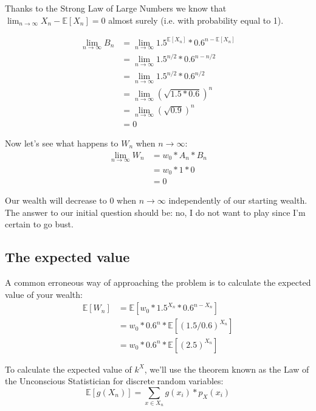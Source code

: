 \documentclass[12pt]{article}
\begin{document}
Thanks to the Strong Law of Large Numbers we know that $\lim_{n\to\infty}{X_n - \mathbb{E}[X_n]} = 0$ almost surely (i.e. with probability equal to 1).

\begin{equation*}
  \begin{split}
    \lim_{n\to\infty} B_n &=  \lim_{n\to\infty}1.5^{\mathbb{E}[X_n]} * 0.6^{n - \mathbb{E}[X_n]} \\
    &= \lim_{n\to\infty} 1.5^{n/2} * 0.6^{n - n/2} \\
    &= \lim_{n\to\infty} 1.5^{n/2} * 0.6^{n/2} \\
    &= \lim_{n\to\infty} (\sqrt{1.5*0.6})^{n}\\
    &= \lim_{n\to\infty} (\sqrt{0.9}) ^{n}\\
    &= 0
  \end{split}
\end{equation*}

Now let's see what happens to $W_n$ when $n \rightarrow \infty$:
\begin{equation*}
  \begin{split}
    \lim_{n\to\infty} W_n &= w_0 * A_n * B_n\\
    & = w_0 * 1 * 0 \\
    & = 0
  \end{split}
\end{equation*}
  
Our wealth will decrease to 0 when $n\to\infty$ independently of our starting wealth. The answer to our initial question should be: no, I do not want to play since I'm certain to go bust.

\subsection{The expected value}
A common erroneous way of approaching the problem is to calculate the expected value of your wealth:
\begin{equation*}
  \begin{split}
    \mathbb{E}[W_n] &= \mathbb{E}[w_0 * 1.5^{X_n} * 0.6^{n-X_n}]\\
    & = w_0 * 0.6^n * \mathbb{E}[(1.5/0.6)^{X_n}]\\
    & = w_0 * 0.6^n * \mathbb{E}[(2.5)^{X_n}]
  \end{split}
\end{equation*}

To calculate the expected value of $k^X$, we'll use the theorem known as the Law of the Unconscious Statistician for discrete random variables:
\begin{equation}
    \mathbb{E}[g(X_n)] = \sum\limits_{x \in X_n} g(x_i)*p_X(x_i)
\end{equation}
\end{document}
